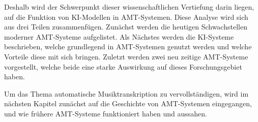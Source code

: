Deshalb wird der Schwerpunkt dieser wissenschaftlichen Vertiefung darin liegen,
auf die Funktion von KI-Modellen in AMT-Systemen.
Diese Analyse wird sich aus drei Teilen zusammenfügen.
Zunächst werden die heutigen Schwachstellen moderner AMT-Systeme aufgelistet.
Als Nächstes werden die KI-Systeme beschrieben,
welche grundlegend in AMT-Systemen genutzt werden und welche Vorteile diese mit sich bringen.
Zuletzt werden zwei neu zeitige AMT-Systeme vorgestellt,
welche beide eine starke Auswirkung auf dieses Forschungsgebiet haben.

Um das Thema automatische Musiktranskription zu vervollständigen,
wird im nächsten Kapitel zunächst auf die Geschichte von AMT-Systemen eingegangen,
und wie frühere AMT-Systeme funktioniert haben und aussahen.